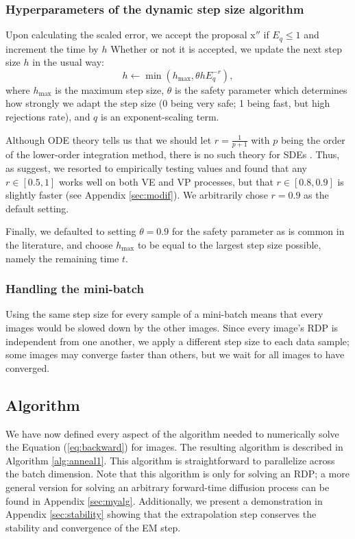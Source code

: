 \documentclass{article}
\newcommand{\x}{\boldsymbol{\mathrm{x}}}
\begin{document}
\subsubsection{Hyperparameters of the dynamic step size algorithm}

Upon calculating the scaled error, we accept the proposal $\x''$ if $E_{q} \leq 1$
and increment the time by $h$
Whether or not it is accepted, we update the next step size $h$ in the usual way:
\begin{equation*}
h \gets \min(h_{\max}, \theta h E_{q}^{-r}),
\end{equation*}
where $h_{\max}$ is the maximum step size, $\theta$ is the safety parameter which determines how strongly we adapt the step size (0 being very safe; 1 being fast, but high rejections rate), and $q$ is an exponent-scaling term.

Although ODE theory tells us that we should let $r=\frac{1}{p+1}$ with $p$ being the order of the lower-order integration method, there is no such theory for SDEs \citep{rackauckas2017adaptive}.
Thus, as \citet{rackauckas2017adaptive} suggest, we resorted to empirically testing values and found that any $r \in [0.5, 1]$ works well on both VE and VP processes, but that $r \in [0.8,0.9]$ is slightly faster (see Appendix \ref{sec:modif}). We arbitrarily chose $r=0.9$ as the default setting.

Finally, we defaulted to setting $\theta=0.9$ for the safety parameter as is common in the literature, and choose $h_{\max}$ to be equal to the largest step size possible, namely the remaining time $t$.


\subsubsection{Handling the mini-batch}

Using the same step size for every sample of a mini-batch means that every images would be slowed down by the other images. 
Since every image's RDP is independent from one another, we apply a different step size to each data sample; some images may converge faster than others, but we wait for all images to have converged. 

\subsection{Algorithm}

We have now defined every aspect of the algorithm needed to numerically solve the Equation (\ref{eq:backward}) for images. The resulting algorithm is described in Algorithm \ref{alg:anneal1}. This algorithm is straightforward to parallelize across the batch dimension.
Note that this algorithm is only for solving an RDP; a more general version for solving an arbitrary forward-time diffusion process can be found in Appendix \ref{sec:myalg}. Additionally, we present a demonstration in Appendix \ref{sec:stability} showing that the extrapolation step conserves the stability and convergence of the EM step.
\end{document}
